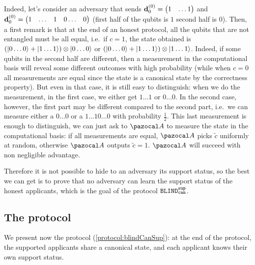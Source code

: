 {\begin{proofE}
    Indeed, let's consider an adversary that sends $\mathbf{d}_0^{(0)} = \begin{pmatrix}1 & \dots 1 \end{pmatrix}$ and $\mathbf{d}_0^{(0)} = \begin{pmatrix}1 & \dots & 1 & 0 \dots & 0 \end{pmatrix}$ (first half of the qubits is $1$ second half is $0$). Then, a first remark is that at the end of an honest protocol, all the qubits that are not entangled must be all equal, i.e.\ if $c=1$, the state obtained is $(\ket{0\dots0} + \ket{1\dots1}) \otimes \ket{0\dots 0}$ or $(\ket{0\dots0} + \ket{1\dots1}) \otimes \ket{1\dots 1}$. Indeed, if some qubits in the second half are different, then a measurement in the computational basis will reveal some different outcomes with high probability (while when $c=0$ all measurements are equal since the state is a canonical \GHZ{} state by the correctness property). But even in that case, it is still easy to distinguish: when we do the measurement, in the first case, we either get $1\dots 1$ or $0 \dots 0$. In the second case, however, the first part may be different compared to the second part, i.e.\ we can measure either a $0\dots 0$ or a $1\dots 10\dots 0$ with probability $\frac{1}{2}$. This last measurement is enough to distinguish, we can just ask to $\cA$ to measure the state in the computational basis: if all measurements are equal, $\cA$ picks $\tilde{c}$ uniformly at random, otherwise $\cA$ outputs $\tilde{c} = 1$. $\cA$ will succeed with non negligible advantage.
  \end{proofE}

  Therefore it is not possible to hide to an adversary its support status, so the best we can get is to prove that no adversary can learn the support status of the honest applicants, which is the goal of the protocol $ {\tt BLIND}^{\tt sup}_{\tt can} {}$.
}

\subsection{The protocol \blindCanSup{}}\label{subsec:blindCanSup}

We present now the protocol \blindCanSup{} (\cref{protocol:blindCanSup}): at the end of the protocol, the supported applicants share a canonical \GHZ{} state, and each applicant knows their own support status.

